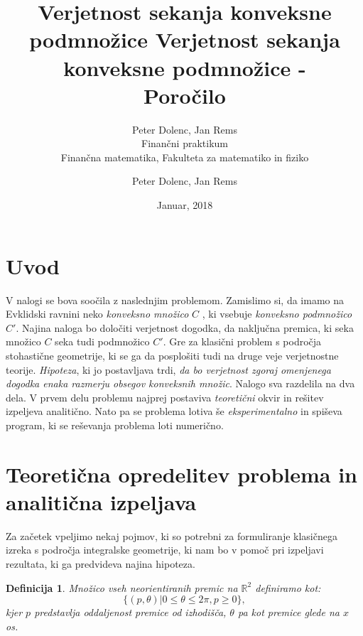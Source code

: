 \documentclass[a4paper]{article}
\title{Verjetnost sekanja konveksne podmnožice}
\author{Peter Dolenc, Jan Rems \\ Finančni praktikum \\ Finančna matematika, Fakulteta za matematiko in fiziko}
\date{Januar, 2018}
\newtheorem{definicija}{Definicija}
\begin{document}
\title{%
  Verjetnost sekanja konveksne podmnožice -\\
   \large Poročilo \\}

\author{Peter Dolenc, Jan Rems}

\maketitle
\thispagestyle{empty}
\pagebreak
\clearpage
\tableofcontents
\thispagestyle{empty}
\pagebreak
\clearpage
\setcounter{page}{1}
\section{Uvod}


V nalogi se bova soočila z naslednjim problemom. Zamislimo si, da imamo na Evklidski ravnini neko \textit{konveksno množico} $C$ , ki vsebuje \textit{konveksno podmnožico } $C'$. Najina naloga bo določiti verjetnost dogodka, da naključna premica, ki seka množico $C$ seka tudi podmnožico $C'$. Gre za klasični problem s področja stohastične geometrije, ki se ga da posplošiti tudi na druge veje verjetnostne teorije. \textit{Hipoteza}, ki jo postavljava trdi, \textit{da bo verjetnost zgoraj omenjenega dogodka enaka razmerju obsegov konveksnih množic}. Nalogo sva razdelila na dva dela. V prvem delu problemu najprej postaviva \textit{teoretični}  okvir in rešitev izpeljeva analitično. Nato pa se problema lotiva še \textit{eksperimentalno} in spiševa program, ki se reševanja problema loti numerično.


\vspace{4 mm}


\section{Teoretična opredelitev problema in analitična izpeljava}

Za začetek vpeljimo nekaj pojmov, ki so potrebni za formuliranje klasičnega izreka s področja integralske geometrije, ki nam bo v pomoč pri izpeljavi rezultata, ki ga predvideva najina hipoteza.

\begin{definicija}\label{def:1}
Množico vseh neorientiranih premic na $\mathbb{R}^2$ definiramo kot: $$ \{ (p,\theta)|0 \le \theta \le 2 \pi , p \ge 0\},$$ kjer $p$ predstavlja oddaljenost premice od izhodišča, $\theta$ pa kot premice glede na $x$ os.
\end{definicija}
\end{document}
